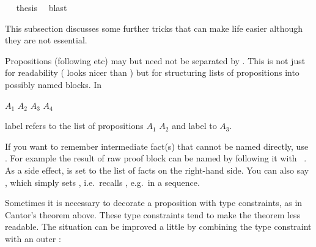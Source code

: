 \begin{isabellebody}
\ \isamarkupfalse%
\ {}thesis\ \isamarkupfalse%
\ blast\isanewline
{}\isamarkupfalse%
%
\endisatagproof
{\isafoldproof}%
%
\isadelimproof
%
\endisadelimproof
%
\renewcommand{\isamarkupcmt}[1]{{\isastylecmt--- #1}}
%
\isamarkuptrue%
%
\begin{isamarkuptext}%
This subsection discusses some further tricks that can make
life easier although they are not essential.%
\end{isamarkuptext}%
\isamarkuptrue%
%
\isamarkuptrue%
%
\begin{isamarkuptext}%
Propositions (following  etc) may but need not be
separated by . This is not just for readability
(    looks nicer than
  ) but for structuring lists of propositions
into possibly named blocks. In
\begin{center}
  $A_1$ $A_2$   $A_3$
 $A_4$
\end{center}
label  refers to the list of propositions $A_1$ $A_2$ and
label  to $A_3$.%
\end{isamarkuptext}%
\isamarkuptrue%
%
\isamarkuptrue%
%
\begin{isamarkuptext}%
If you want to remember intermediate fact(s) that cannot be
named directly, use . For example the result of raw
proof block can be named by following it with
~.  As a side effect,
 is set to the list of facts on the right-hand side. You
can also say , which simply sets ,
i.e.\ recalls , e.g.\ in a  sequence.%
\end{isamarkuptext}%
\isamarkuptrue%
%
\isamarkuptrue%
%
\begin{isamarkuptext}%
Sometimes it is necessary to decorate a proposition with type
constraints, as in Cantor's theorem above. These type constraints tend
to make the theorem less readable. The situation can be improved a
little by combining the type constraint with an outer :%

\end{isamarkuptext}
\end{isabellebody}
